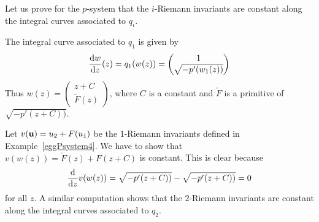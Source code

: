 \begin{egg}
Let us prove for the $p$-system that the $i$-Riemann invariants
are constant along the integral curves associated to $q_i$.

The integral curve associated to $q_1$ is given by
\[
\dydx{w}{z}(z) = q_1(w(z)) = \begin{pmatrix} 1 \\ \sqrt{-p'(w_1(z))}
\end{pmatrix}
\]
Thus $\displaystyle w(z) = \begin{pmatrix} z + C \\ \tilde{F}(z) \end{pmatrix}$,
where $C$ is a constant and $\tilde{F}$ is a primitive of $\sqrt{-p'(z+C))}$.

Let $v(\VEC{u}) = u_2 + F(u_1)$ be the $1$-Riemann invariants defined in
Example~\ref{eggPsystem4}. We have to show that
$v(w(z)) = \tilde{F}(z) + F(z+C)$ is constant.  This is clear because
\[
\dfdx{v(w(z))}{z} = \sqrt{-p'(z+C))} - \sqrt{-p'(z+C))} = 0
\]
for all $z$.  A similar computation shows that the $2$-Riemann invariants
are constant along the integral curves associated to $q_2$.
\end{egg}


